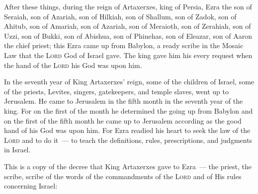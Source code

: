
\begin{inparaenum}
     After these things, during the reign of Artaxerxes, king of Persia, Ezra the son of Seraiah, son of Azariah, son of Hilkiah,%
     son of Shallum, son of Zadok, son of Ahitub,%
     son of Amariah, son of Azariah, son of Meraioth,%
     son of Zerahiah, son of Uzzi, son of Bukki,%
     son of Abishua, son of Phinehas, son of Eleazar, son of Aaron the chief priest;%
     this Ezra came up from Babylon, a ready scribe in the Mosaic Law that the \textsc{Lord} God of Israel gave. The king gave him his every request when the hand of the \textsc{Lord} his God was upon him.%
    
     In the seventh year of King Artaxerxes' reign, some of the children of Israel, some of the priests, Levites, singers, gatekeepers, and temple slaves, went up to Jerusalem.%
     He came to Jerusalem in the fifth month in the seventh year of the king.%
     For on the first of the month he determined the going up from Babylon and on the first of the fifth month he came up to Jerusalem according as the good hand of his God was upon him.%
     For Ezra readied his heart to seek the law of the \textsc{Lord} and to do it~--- to teach the definitions, rules, prescriptions, and judgments in Israel.%
    
     This is a copy of the decree that King Artaxerxes gave to Ezra~--- the priest, the scribe, scribe of the words of the commandments of the \textsc{Lord} and of His rules concerning Israel:%
\end{inparaenum}

